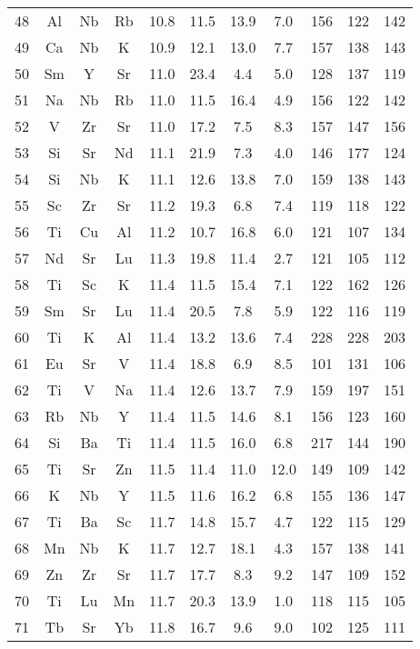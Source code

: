 \begin{center}
\begin{xtabular}{c|ccc|cccc|ccc}
 48 &  Al &  Nb &  Rb &  10.8 &  11.5 &  13.9 & 7.0 & 156 & 122 & 142 \\
 49 &  Ca &  Nb &   K &  10.9 &  12.1 &  13.0 & 7.7 & 157 & 138 & 143 \\
 50 &  Sm &   Y &  Sr &  11.0 &  23.4 & 4.4 & 5.0 & 128 & 137 & 119 \\
 51 &  Na &  Nb &  Rb &  11.0 &  11.5 &  16.4 & 4.9 & 156 & 122 & 142 \\
 52 &   V &  Zr &  Sr &  11.0 &  17.2 & 7.5 & 8.3 & 157 & 147 & 156 \\
 53 &  Si &  Sr &  Nd &  11.1 &  21.9 & 7.3 & 4.0 & 146 & 177 & 124 \\
 54 &  Si &  Nb &   K &  11.1 &  12.6 &  13.8 & 7.0 & 159 & 138 & 143 \\
 55 &  Sc &  Zr &  Sr &  11.2 &  19.3 & 6.8 & 7.4 & 119 & 118 & 122 \\
 56 &  Ti &  Cu &  Al &  11.2 &  10.7 &  16.8 & 6.0 & 121 & 107 & 134 \\
 57 &  Nd &  Sr &  Lu &  11.3 &  19.8 &  11.4 & 2.7 & 121 & 105 & 112 \\
 58 &  Ti &  Sc &   K &  11.4 &  11.5 &  15.4 & 7.1 & 122 & 162 & 126 \\
 59 &  Sm &  Sr &  Lu &  11.4 &  20.5 & 7.8 & 5.9 & 122 & 116 & 119 \\
 60 &  Ti &   K &  Al &  11.4 &  13.2 &  13.6 & 7.4 & 228 & 228 & 203 \\
 61 &  Eu &  Sr &   V &  11.4 &  18.8 & 6.9 & 8.5 & 101 & 131 & 106 \\
 62 &  Ti &   V &  Na &  11.4 &  12.6 &  13.7 & 7.9 & 159 & 197 & 151 \\
 63 &  Rb &  Nb &   Y &  11.4 &  11.5 &  14.6 & 8.1 & 156 & 123 & 160 \\
 64 &  Si &  Ba &  Ti &  11.4 &  11.5 &  16.0 & 6.8 & 217 & 144 & 190 \\
 65 &  Ti &  Sr &  Zn &  11.5 &  11.4 &  11.0 &  12.0 & 149 & 109 & 142 \\
 66 &   K &  Nb &   Y &  11.5 &  11.6 &  16.2 & 6.8 & 155 & 136 & 147 \\
 67 &  Ti &  Ba &  Sc &  11.7 &  14.8 &  15.7 & 4.7 & 122 & 115 & 129 \\
 68 &  Mn &  Nb &   K &  11.7 &  12.7 &  18.1 & 4.3 & 157 & 138 & 141 \\
 69 &  Zn &  Zr &  Sr &  11.7 &  17.7 & 8.3 & 9.2 & 147 & 109 & 152 \\
 70 &  Ti &  Lu &  Mn &  11.7 &  20.3 &  13.9 & 1.0 & 118 & 115 & 105 \\
 71 &  Tb &  Sr &  Yb &  11.8 &  16.7 & 9.6 & 9.0 & 102 & 125 & 111 \\

\end{xtabular}
\end{center}
